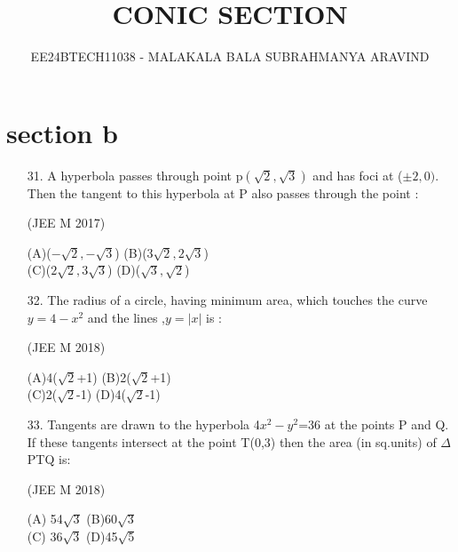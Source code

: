 \documentclass[journal,12pt,twocolumn]{IEEEtran}
\theoremstyle{remark}
\begin{document}

\vspace{3cm}

\title{CONIC SECTION}
\author{EE24BTECH11038 - MALAKALA BALA SUBRAHMANYA ARAVIND}
\maketitle
\newpage
\bigskip

\renewcommand{\thefigure}{\theenumi}
\renewcommand{\thetable}{\theenumi}
\section{section b}
\begin{enumerate}
\item[31.]  A hyperbola passes through point  p$(\sqrt2,\sqrt3)$  and  has  foci  at 
      ($\pm2,0)$. Then  the  tangent  to  this  hyperbola at P also passes through the point :
      
      \hfill{(JEE M 2017)} 

    (A)($-\sqrt2,-\sqrt3$) \hspace{2cm} (B)($3\sqrt2,2\sqrt3$)\\


    (C)($2\sqrt2,3\sqrt3$) \hspace{2cm}  (D)($\sqrt3,\sqrt2$)\\

\item[32.]  The radius of a circle, having minimum area, which touches the curve $y=4-x^2$ and the lines ,$y=|{x}|$ is : 

      \hfill{(JEE M 2018)}

     (A)4($\sqrt2$+1) \hspace{2cm} (B)2($\sqrt2$+1)\\

     (C)2($\sqrt2$-1)  \hspace{2cm}  (D)4($\sqrt2$-1)\\

\item[33.] Tangents are drawn to the hyperbola 4$x^2-y^2$=36 at the points P and Q. If  these tangents intersect  at the point T(0,3) then the area (in sq.units) of $\Delta$ PTQ is:
    
     \hfill{(JEE M 2018)}

     (A) 54$\sqrt3$  \hspace{2cm}  (B)60$\sqrt3$\\

     (C) 36$\sqrt3$  \hspace{2cm}  (D)45$\sqrt5$\\


\end{enumerate}
\end{document}

